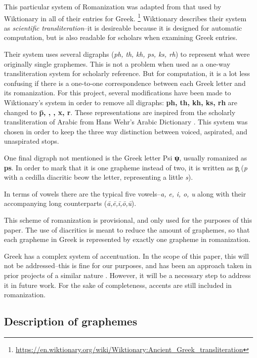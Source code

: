\documentclass[12pt]{article}
\begin{document}
This particular system of Romanization was adapted from that used by Wiktionary
in all of their entries for
Greek.
\footnote{\url{https://en.wiktionary.org/wiki/Wiktionary:Ancient_Greek_transliteration}}
Wiktionary describes their system as \textit{scientific transliteration}--it
is desireable because it is designed for automatic computation, but is also
readable for scholars when examining Greek entries.

Their system uses several digraphs (\textit{ph, th, kh, ps, ks, rh}) to
represent what were originally single graphemes. This is not a problem when
used as a one-way transliteration system for scholarly reference. But for
computation, it is a lot less confusing if there is a one-to-one correspondence
between each Greek letter and its romanization. For this project, several
modifications have been made to Wiktionary's system in order to remove all
digraphs: \textbf{ph, th, kh, ks, rh} are changed to \textbf{\={p},
, , x, r}.  These representations are
inspired from the scholarly transliteration of Arabic from Hans Wehr's Arabic
Dictionary \citep{wehr61}. This system was chosen in order to keep the three
way distinction between voiced, aspirated, and unaspirated stops.

One final digraph not mentioned is the Greek letter Psi \textbf{ψ}, usually
romanized as \textbf{ps}. In order to mark that it is one grapheme instead
of two, it is written as \c{p} (\textit{p} with a cedilla diacritic
beow the letter, representing a little \textit{s}).

In terms of vowels there are the typical five vowels--\textit{a, e, i, o, u}
along with their accompanying long counterparts
(\textit{\={a},\={e},\={i},\={o},\={u}}).

This scheme of romanization is provisional, and only used for the purposes of
this paper. The use of diacritics is meant to reduce the amount of graphemes,
so that each grapheme in Greek is represented by exactly one grapheme
in romanization.

Greek has a complex system of accentuation. In the scope of this paper, this
will not be addressed--this is fine for our purposes, and has been an approach
taken in prior projects of a similar nature \citep{crane91}. However, it will
be a necessary step to address it in future work. For the sake of completeness,
accents are still included in romanization.

\subsection{Description of graphemes}
\end{document}

